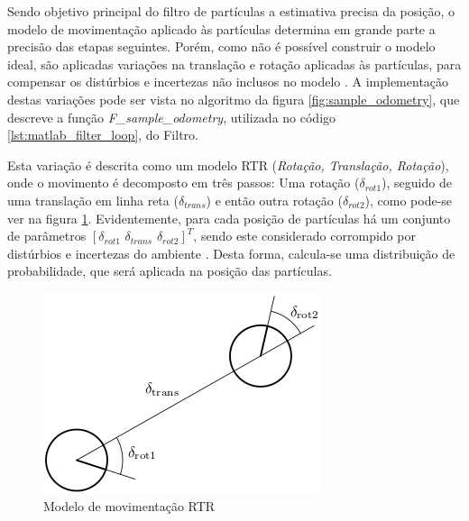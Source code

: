 \documentclass[
	12pt,				%
	openright,			%
	oneside,			%
	a4paper,			%
	english,			%
	french,				%
	spanish,			%
	brazil,				%
	]{abntex2}
\begin{document}
Sendo objetivo principal do filtro de partículas a estimativa precisa da posição, o modelo de movimentação aplicado às partículas determina em grande parte a precisão das etapas seguintes. Porém, como não é possível construir o modelo ideal, são aplicadas variações na translação e rotação aplicadas às partículas, para compensar os distúrbios e incertezas não inclusos no modelo \cite{pftuto}. A implementação destas variações pode ser vista no algoritmo da figura \ref{fig:sample_odometry}, que descreve a função \emph{F\_sample\_odometry}, utilizada no código \ref{lst:matlab_filter_loop}, do Filtro.\par
Esta variação é descrita como um modelo RTR (\emph{Rotação, Translação, Rotação}), onde o movimento é decomposto em três passos: Uma rotação ($\delta_{rot1}$), seguido de uma translação em linha reta ($\delta_{trans}$) e então outra rotação ($\delta_{rot2}$), como pode-se ver na figura \ref{fig:rtr_model}. Evidentemente, para cada posição de partículas há um conjunto de parâmetros $[\delta_{rot1}\,\,\delta_{trans}\,\,\delta_{rot2}]^T$, sendo este considerado corrompido por distúrbios e incertezas do ambiente \cite{THR05}. Desta forma, calcula-se uma distribuição de probabilidade, que será aplicada na posição das partículas.\par

\begin{figure}[h!]
    \centering
    \includegraphics[scale=0.6]{figs/rtr_model}
    \caption{Modelo de movimentação RTR}
    \label{fig:rtr_model}
\end{figure}
\end{document}
